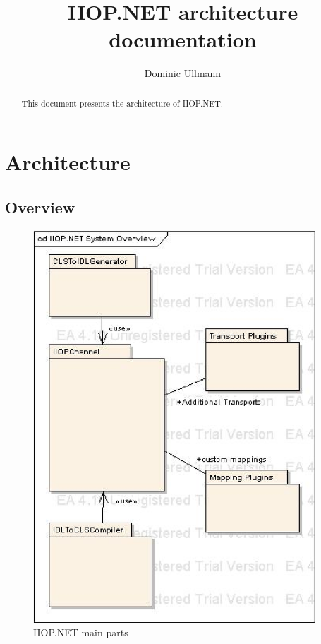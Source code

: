 \documentclass[a4paper]{report}
\begin{document}
\title{IIOP.NET architecture documentation}
\author{Dominic Ullmann\\[5mm]
}
\maketitle

\begin{abstract}
This document presents the architecture of IIOP.NET. 
\end{abstract}


\tableofcontents 
\newpage
\listoffigures
\newpage

\chapter{Architecture}

\section{Overview}

\begin{figure}[h]
\begin{center}
\includegraphics[width=300pt]{DecompOverview.EPS}
\end{center}
\caption{IIOP.NET main parts}
\end{figure}
\end{document}
